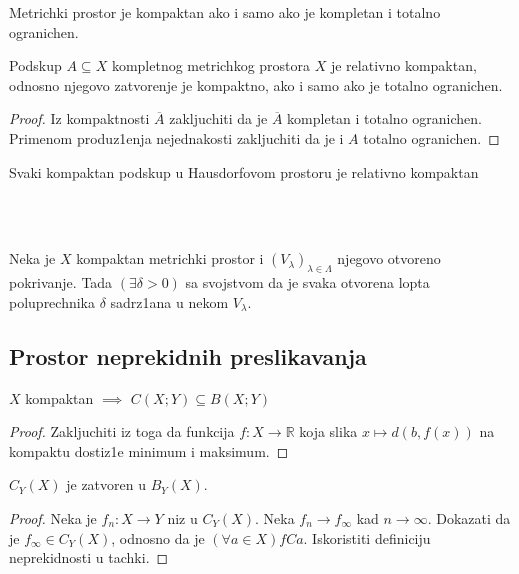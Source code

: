 \documentclass[a4paper,12pt]{article}
\newcommand{\RR}{\mathbb{R}}
\newcommand{\psj}{\subseteq}
\begin{document}
\begin{posl}
Metrichki prostor je kompaktan ako i samo ako je kompletan i totalno ogranichen.
\end{posl}

\begin{tvr}
Podskup $A \psj X$ kompletnog metrichkog prostora $X$ je relativno kompaktan, odnosno njegovo zatvorenje je kompaktno, ako i samo ako je totalno ogranichen.
\end{tvr}
\begin{proof}
Iz kompaktnosti $\overline{A}$ zakljuchiti da je $\overline{A}$ kompletan i totalno ogranichen. Primenom produz1enja nejednakosti zakljuchiti da je i $A$ totalno ogranichen.
\end{proof}

\begin{nap}
Svaki kompaktan podskup u Hausdorfovom prostoru je relativno kompaktan
\end{nap}
\\ \\
\begin{lema}
Neka je $X$ kompaktan metrichki prostor i $(V_{\lambda})_{\lambda \in \Lambda}$ njegovo otvoreno pokrivanje. Tada $(\exists \delta > 0)$ sa svojstvom da je svaka otvorena lopta poluprechnika $\delta$ sadrz1ana u nekom $V_{\lambda}$.
\end{lema}

\subsection{Prostor neprekidnih preslikavanja}

\begin{tvr}
$X$ kompaktan $\implies$ $C(X;Y) \psj B(X;Y)$
\end{tvr}
\begin{proof}
Zakljuchiti iz toga da funkcija $f:X \to \RR$ koja slika $x\mapsto d(b,f(x))$ na kompaktu dostiz1e minimum i maksimum.
\end{proof}

\begin{tvr}
$C_Y(X)$ je zatvoren u $B_Y(X)$.
\end{tvr}
\begin{proof}
Neka je $f_n:X \to Y$ niz u $C_Y(X)$. Neka $f_n \longrightarrow f_{\infty}$ kad $n \to \infty$. Dokazati da je $f_{\infty} \in C_Y(X)$, odnosno da je $(\forall
a \in X) fCa$. Iskoristiti definiciju neprekidnosti u tachki.
\end{proof}
\end{document}
